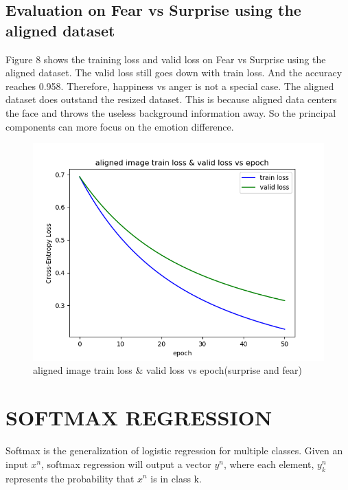 \documentclass{article} %
\begin{document}
\subsection {Evaluation on Fear vs Surprise using the aligned dataset}
Figure 8 shows the training loss and valid loss on Fear vs Surprise using the aligned dataset. The valid loss still goes down with train loss. And the accuracy reaches 0.958. Therefore, happiness vs anger is not a special case. The aligned dataset does outstand the resized dataset. This is because aligned data centers the face and throws the useless background information away. So the principal components can more focus on the emotion difference.
\begin{figure}[h]
	\centering
	\includegraphics[scale=0.5]{./graph/aligned_angerfear.png}
	\caption{aligned image train loss \& valid loss vs epoch(surprise and fear)}
\end{figure}

\section{SOFTMAX REGRESSION}
Softmax is the generalization of logistic regression for multiple classes. Given an input $x^n$, softmax regression will output a vector $y^n$, where each element, $y_k^n$ represents the probability that $x^n$ is in class k.
\end{document}
